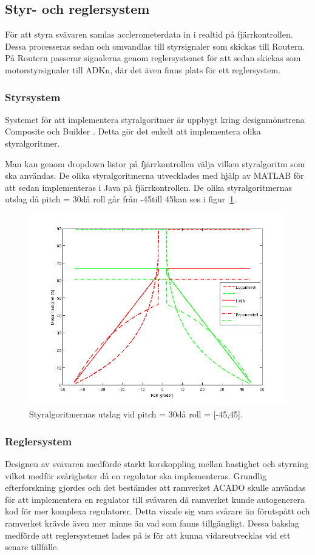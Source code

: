 \subsection{Styr- och reglersystem}
\label{subsec:styr och regler}
För att styra svävaren samlas acclerometerdata in i realtid på fjärrkontrollen.
Dessa processeras sedan och omvandlas till styrsignaler som skickas till
Routern. På Routern passerar signalerna genom reglersystemet för att sedan
skickas som motorstyrsignaler till ADKn, där det även finns plats för ett
reglersystem.

\subsubsection{Styrsystem}
Systemet för att implementera styralgoritmer är uppbygt kring designmönstrena
Composite \cite{Composite pattern} och Builder \cite{Builder pattern}. Detta gör
det enkelt att implementera olika styralgoritmer.

Man kan genom dropdown listor på fjärrkontrollen välja vilken styralgoritm som
ska användas. De olika styralgoritmerna utvecklades med hjälp av MATLAB för att
sedan implementeras i Java på fjärrkontrollen. De olika styralgoritmernas utslag
då pitch = 30\degree  då roll går från -45\degree till 45\degree  kan ses i
figur~\ref{fig:styralgoritmer}.

\begin{figure}[htbp!]
\centering
\includegraphics[width=12cm]{../../includes/figures/Styralgoritmer}
\caption{Styralgoritmernas utslag vid pitch = 30\degree då roll = [-45,45].}
\label{fig:styralgoritmer}
\end{figure}

\subsubsection{Reglersystem}
Designen av svävaren medförde starkt korskoppling mellan hastighet och
styrning vilket medför svårigheter då en regulator ska implementeras.
Grundlig efterforskning gjordes och det bestämdes att ramverket ACADO
\cite{ACADO} skulle användas för att implementera en regulator till svävaren då
ramverket kunde autogenerera kod för mer komplexa regulatorer. Detta visade sig
vara svårare än förutspått och ramverket krävde även mer minne än vad som fanns
tillgängligt. Dessa bakslag medförde att reglersystemet lades på is för att
kunna vidareutvecklas vid ett senare tillfälle.

